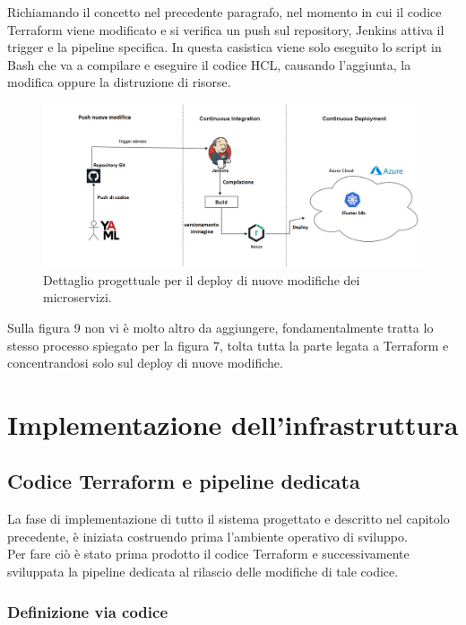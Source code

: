 \documentclass[a4paper,12pt]{report}
\begin{document}
Richiamando il concetto nel precedente paragrafo, nel momento in cui il codice Terraform viene modificato e si verifica un push sul repository, Jenkins attiva il trigger e la pipeline specifica. In questa casistica viene solo eseguito lo script in Bash che va a compilare e eseguire il codice HCL, causando l'aggiunta, la modifica oppure la distruzione di risorse.\\

\begin{figure}[h]
	\includegraphics[width=1.0\textwidth]{push_modifica}
    \caption{Dettaglio progettuale per il deploy di nuove modifiche dei microservizi.}
    \label{fig:push_modifica}
\end{figure}

Sulla figura 9 non vi è molto altro da aggiungere, fondamentalmente tratta lo stesso processo spiegato per la figura 7, tolta tutta la parte legata a Terraform e concentrandosi solo sul deploy di nuove modifiche.

\chapter{Implementazione dell'infrastruttura}
\section{Codice Terraform e pipeline dedicata}
La fase di implementazione di tutto il sistema progettato e descritto nel capitolo precedente, è iniziata costruendo prima l'ambiente operativo di sviluppo. \\
Per fare ciò è stato prima prodotto il codice Terraform e successivamente sviluppata la pipeline dedicata al rilascio delle modifiche di tale codice.\\

\subsection{Definizione via codice}
\end{document}
